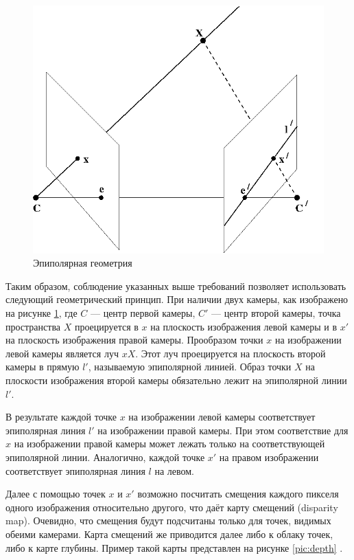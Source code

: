 \begin{figure}[H]
	\begin{center}
		\includegraphics[scale=0.5]{pics/epipolar geometry.png}
		\caption{Эпиполярная геометрия} 
		\label{pic:epipol} %
	\end{center}
\end{figure}

Таким образом, соблюдение указанных выше требований позволяет использовать следующий геометрический принцип. При наличии двух камеры, как изображено 
на рисунке \ref{pic:epipol}, где $C$ — центр первой камеры, $C'$ — центр второй камеры, точка пространства $X$  
проецируется в $x$ на плоскость изображения левой камеры и в $x'$ на плоскость изображения правой камеры. Прообразом точки $x$ на изображении левой 
камеры является луч $xX$. Этот луч проецируется на плоскость второй камеры в прямую $l'$, называемую эпиполярной линией. Образ точки $X$ на плоскости 
изображения второй камеры обязательно лежит на эпиполярной линии $l'$.

В результате каждой точке $x$ на изображении левой камеры соответствует эпиполярная линия $l'$ на изображении правой камеры. При этом соответствие для $x$ на 
изображении правой камеры может лежать только на соответствующей эпиполярной линии. Аналогично, каждой точке $x'$ на правом изображении соответствует 
эпиполярная линия $l$ на левом.

Далее с помощью точек $x$ и $x'$ возможно посчитать смещения каждого пикселя одного изображения относительно другого, что даёт карту смещений (disparity map). 
Очевидно, что смещения будут подсчитаны только для точек, видимых обеими камерами. Карта смещений же приводится далее либо к облаку точек, либо к карте глубины. 
Пример такой карты представлен на рисунке \ref{pic:depth} \cite{lipson2021raft}. 

